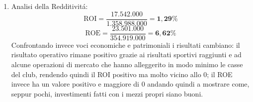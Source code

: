 \documentclass[
    corpo=12pt,
    oneside,
    evenboxes,
    tipotesi=triennale,
    stile=classica,
    oldstyle,
    autoretitolo,
    greek,
]{toptesi}
\begin{document}
\begin{interlinea}{1.5}
\begin{enumerate}
\begin{equation}
            \text{Grado di Indipendenza Finanziaria} = \frac{132.607.000}{1.358.998.000} = \mathbf{9,7\%}
        \label{eqn: indeb_barca}
        \end{equation}
        \begin{equation}
            \text{Margine di Struttura} = 132.607.000-747.979.000 = \mathbf{-615.372.000\mbox{\euro}}
        \label{eqn: marg_strutt_barca}
        \end{equation}
        Anche la solidit\'a della societ\'a non produce risultati molto soddisfacenti: il patrimonio netto non finanzia neanche il 10\% 
        delle passivit\'a totali, mentre le immobilizzazioni risultano "scoperte" per pi\'u di 600mln€. Questi risultati evidenziano come
        la societ\'a faccia uso quasi nella totalit\'a al capitale di debito.\newpage
    \item Analisi della Redditivit\'a:\newline
        \begin{equation}
            \text{ROI} = \frac{17.542.000}{1.358.988.000} = \mathbf{1,29\%}
        \label{eqn: roi_barca}
        \end{equation}
        \begin{equation}
            \text{ROE} = \frac{23.501.000}{354.919.000} = \mathbf{6,62\%}
        \label{eqn: roe_barca}
        \end{equation}
        Confrontando invece voci economiche e patrimoniali i risultati cambiano: il risultato operativo rimane positivo grazie ai risultati sportivi
        raggiunti e ad alcune operazioni di mercato che hanno alleggerito in modo minimo le casse del club, rendendo quindi il ROI positivo 
        ma molto vicino allo 0; il ROE invece ha un valore positivo e maggiore di 0 andando quindi a mostrare come, seppur pochi, investimenti 
        fatti con i mezzi propri siano buoni.
\end{enumerate}

\end{interlinea}
\end{document}
